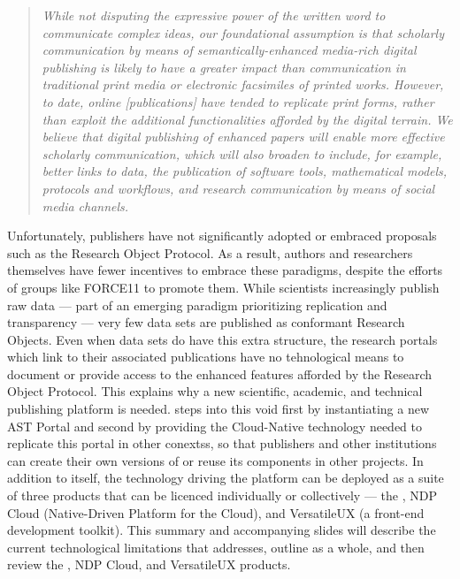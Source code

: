 \documentclass[11pt,letterpaper]{article}
\begin{document}
\begin{quote}
{\textit{While not disputing the expressive power of the written 
word to communicate complex ideas, our foundational assumption 
is that scholarly communication by means of semantically-enhanced 
media-rich digital publishing is likely to have a greater impact 
than communication in traditional print media or electronic 
facsimiles of printed works.  However, to date, online [publications] 
have tended to replicate print forms, rather than exploit the 
additional functionalities afforded by the digital terrain.  
We believe that digital publishing of enhanced papers will enable 
more effective scholarly communication, which will also broaden 
to include, for example, better links to data, the publication of 
software tools, mathematical models, protocols and workflows, and 
research communication by means of social media channels.}}
\end{quote}
\qvspace{}
\p{}
Unfortunately, publishers have not significantly adopted 
or embraced proposals such as the Research Object Protocol.  
As a result, authors and researchers themselves have 
fewer incentives to embrace these paradigms, 
despite the efforts of groups like FORCE11 to promote them.  
While scientists increasingly publish raw data --- part of 
an emerging paradigm prioritizing replication 
and transparency --- very few data sets are published 
as conformant Research Objects.  
Even when data sets do have this 
extra structure, the research portals which 
link to their associated publications have 
no tehnological means to document 
or provide access to the enhanced features 
afforded by the Research Object Protocol.
\p{}
This explains why a new scientific, academic, and technical 
publishing platform is needed.  {\MOSAIC} 
steps into this void first by instantiating a new 
AST Portal and second by providing the Cloud-Native 
technology needed to replicate this portal in 
other conextss, so that publishers and 
other institutions can create their own versions of 
{\MOSAIC} or reuse its components in other projects.
\p{}
In addition to {\MOSAIC} itself, 
the technology driving the platform can be 
deployed as a suite of three products that can 
be licenced individually or collectively --- the
{\MOSAIC} {\SDK}, NDP Cloud (Native-Driven Platform 
for the Cloud), and VersatileUX (a front-end 
development toolkit).  
\p{}
This summary and accompanying slides will describe the 
current technological limitations that {\MOSAIC} 
addresses, outline {\MOSAIC} as a whole, 
and then review the {\MOSAIC} {\SDK}, NDP Cloud, 
and VersatileUX products.
\p{}
\end{document}
